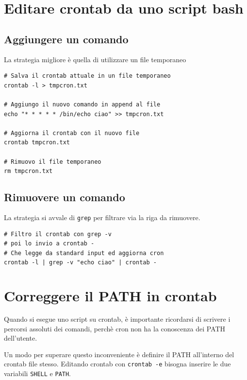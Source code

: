\documentclass[a4paper]{report}
\newenvironment{code}{\begin{tcolorbox}[size=small]}{\end{tcolorbox}}
\begin{document}
\section {Editare crontab da uno script bash}

\subsection{Aggiungere un comando}

La strategia migliore è quella di utilizzare un file temporaneo

\begin{code}
\begin{lstlisting}
# Salva il crontab attuale in un file temporaneo
crontab -l > tmpcron.txt

# Aggiungo il nuovo comando in append al file
echo "* * * * * /bin/echo ciao" >> tmpcron.txt

# Aggiorna il crontab con il nuovo file
crontab tmpcron.txt

# Rimuovo il file temporaneo
rm tmpcron.txt
\end{lstlisting}
\end{code}

\subsection{Rimuovere un comando}

La strategia si avvale di \texttt{grep} per filtrare via la riga da rimuovere.

\begin{code}
\begin{lstlisting}
# Filtro il crontab con grep -v 
# poi lo invio a crontab -
# Che legge da standard input ed aggiorna cron
crontab -l | grep -v "echo ciao" | crontab -
\end{lstlisting}
\end{code}

\section{Correggere il PATH in crontab}

Quando si esegue uno script su crontab, è importante ricordarsi di scrivere i percorsi assoluti dei comandi, perchè cron non ha la conoscenza dei PATH dell'utente.

Un modo per superare questo inconveniente è definire il PATH all'interno del crontab file stesso.
Editando crontab con \texttt{crontab -e} bisogna inserire le due variabili \texttt{SHELL} e \texttt{PATH}.
\end{document}
